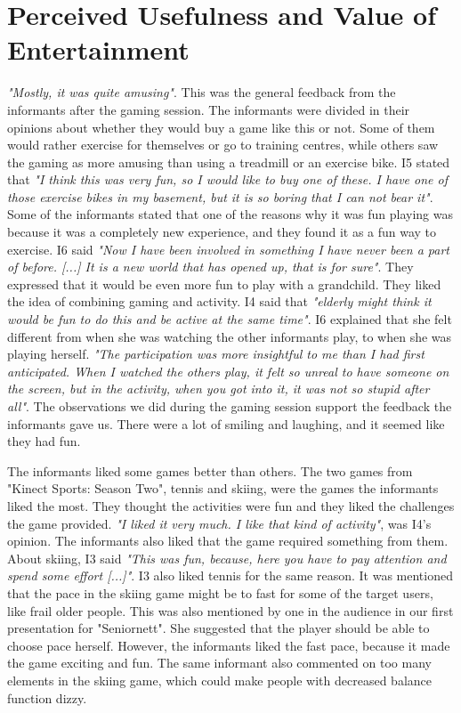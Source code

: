 \section{Perceived Usefulness and Value of Entertainment}
\emph{"Mostly, it was quite amusing"}. This was the general feedback from the informants after the gaming session. The informants were divided in their opinions about whether they would buy a game like this or not. Some of them would rather exercise for themselves or go to training centres, while others saw the gaming as more amusing than using a treadmill or an exercise bike. I5 stated that \emph{"I think this was very fun, so I would like to buy one of these. I have one of those exercise bikes in my basement, but it is so boring that I can not bear it"}.  Some of the informants stated that one of the reasons why it was fun playing was because it was a completely new experience, and they found it as a fun way to exercise. I6 said \emph{"Now I have been involved in something I have never been a part of before. [...] It is a new world that has opened up, that is for sure"}. They expressed that it would be even more fun to play with a grandchild. They liked the idea of combining gaming and activity. I4 said that \emph{"elderly might think it would be fun to do this and be active at the same time"}. I6 explained that she felt different from when she was watching the other informants play, to when she was playing herself. \emph{"The participation was more insightful to me than I had first anticipated. When I watched the others play, it felt so unreal to have someone on the screen, but in the activity, when you got into it, it was not so stupid after all"}. The observations we did during the gaming session support the feedback the informants gave us. There were a lot of smiling and laughing, and it seemed like they had fun.  

The informants liked some games better than others. The two games from "Kinect Sports: Season Two", tennis and skiing, were the games the informants liked the most. They thought the activities were fun and they liked the challenges the game provided. \emph{"I liked it very much. I like that kind of activity"}, was I4's opinion. The informants also liked that the game required something from them. About skiing, I3 said \emph{"This was fun, because, here you have to pay attention and spend some effort [...]"}. I3 also liked tennis for the same reason. It was mentioned that the pace in the skiing game might be to fast for some of the target users, like frail older people. This was also mentioned by one in the audience in our first presentation for "Seniornett".  She suggested that the player should be able to choose pace herself. However, the informants liked the fast pace, because it made the game exciting and fun. The same informant also commented on too many elements in the skiing game, which could make people with decreased balance function dizzy. 

